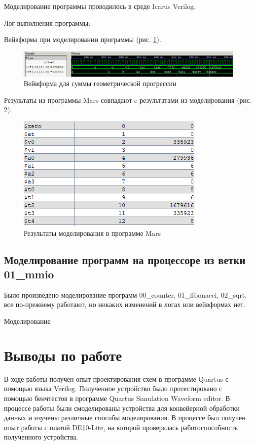 \documentclass[a4paper,14pt]{article}
\begin{document}
	Моделирование программы проводилось в среде Icarus Verilog.
	
	Лог выполнения программы:
	
	{\small {}}
	
	Вейвформа при моделировании программы (рис. \ref{fig:99wvf}).
	
	\begin{figure}[H]
		\centering
		\includegraphics[width=0.95\linewidth]{images/99_wvf}
		\caption{Вейвформа для суммы геометрической прогрессии}
		\label{fig:99wvf}
	\end{figure}

	Результаты из программы Mars совпадают c результатами из моделирования (рис. \ref{fig:99mars}).

	\begin{figure}[H]
		\centering
		\includegraphics[width=0.5\linewidth]{images/99_mars}
		\caption{Результаты моделирования в программе Mars}
		\label{fig:99mars}
	\end{figure}

	\subsection{Моделирование программ на процессоре из ветки 01\_mmio}
	
	Было произведено моделирование программ  00\_counter, 01\_fibonacci, 02\_sqrt, все по-прежнему работают, но никаких изменений в логах или вейвформах нет.
	
	Моделирование 
	
	\section{Выводы по работе}
	
	В ходе работы получен опыт проектирования схем в программе Quartus с помощью языка Verilog.
	Полученное устройство было протестировано с помощью бенчтестов в программе Quartus Simulation Waveform editor.
	В процессе работы были смоделированы устройства для конвейерной обработки данных и изучены различные способы моделирования.
	В процессе был получен опыт работы с платой DE10-Lite, на которой проверялась работоспособность полученного устройства.
	
\end{document}
